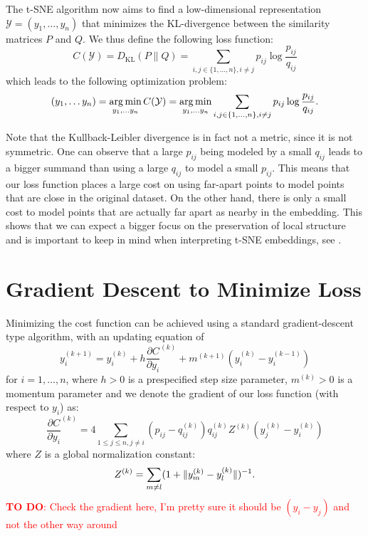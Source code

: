 The t-SNE algorithm now aims to find a low-dimensional representation $\mathcal{Y} = (y_1, \dots, y_n)$ that minimizes the KL-divergence between the similarity matrices $P$ and $Q$. 
We thus define the following loss function: 
\begin{equation}
    C(\mathcal{Y}) = D_{\text{KL}}(P \parallel Q) = \sum_{i,j \in \{1,\dots,n\}, i \neq j} p_{ij} \log \frac{p_{ij}}{q_{ij}}
\end{equation}
which leads to the following optimization problem: 
\begin{equation}
    (y_1, \dots y_n) = \operatorname*{arg\,min}_{y_1, \dots y_n} C(\mathcal{Y}) = \operatorname*{arg\,min}_{y_1, \dots y_n} \sum_{i,j \in \{1,\dots,n\}, i \neq j} p_{ij} \log \frac{p_{ij}}{q_{ij}}.
\end{equation}


Note that the Kullback-Leibler divergence is in fact not a metric, since it is not symmetric. 
One can observe that a large $p_{ij}$ being modeled by a small $q_{ij}$ leads to a bigger summand than using a large $q_{ij}$ to model a small $p_{ij}$. 
This means that our loss function places a large cost on using far-apart points to model points that are close in the original dataset. 
On the other hand, there is only a small cost to model points that are actually far apart as nearby in the embedding. 
This shows that we can expect a bigger focus on the preservation of local structure and is important to keep in mind when interpreting t-SNE embeddings, see \cite{Wa16Distill}. 

\section{Gradient Descent to Minimize Loss}
Minimizing the cost function can be achieved using a standard gradient-descent type algorithm, with an updating equation of 
\begin{equation}
    y_i^{(k+1)} = y_i^{(k)} + h \frac{\partial C}{\partial y_i}^{(k)} + m^{(k+1)}(y_i^{(k)} - y_i^{(k-1)}) 
\end{equation}
for $i=1,\dots,n$, where $h >0$ is a prespecified step size parameter, $m^{(k)} > 0$ is a momentum parameter and we denote the gradient of our loss function (with respect to $y_i$) as: 
\begin{equation}
    \frac{\partial C}{\partial y_i}^{(k)} = 4 \sum_{1 \leq j \leq n, j \neq i} (p_{ij} - q_{ij}^{(k)}) q_{ij}^{(k)} Z^{(k)} (y_j^{(k)} - y_i^{(k)})
\end{equation}
where $Z$ is a global normalization constant: 
\begin{equation}
    Z^{(k)} = \sum_{m \neq l} (1 + \lVert y_m^{(k)} - y_l^{(k)}\rVert)^{-1}. 
\end{equation}
\textcolor{red}{\textbf{TO DO}: Check the gradient here, I'm pretty sure it should be $(y_i - y_j)$ and not the other way around}


